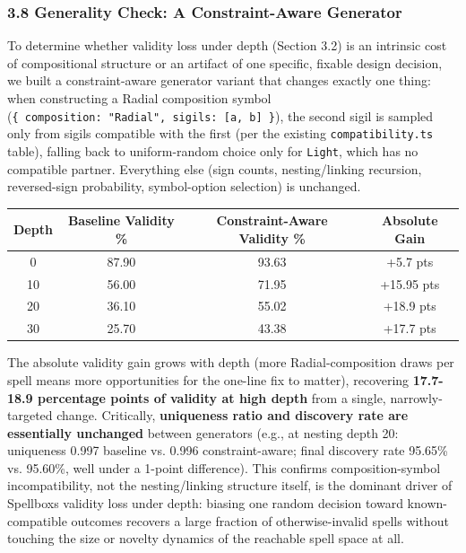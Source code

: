\documentclass[
  10pt,
  twocolumn]{article}
\begin{document}
\subsubsection{3.8 Generality Check: A Constraint-Aware
Generator}\label{38-generality-check-a-constraint-aware-generator}

To determine whether validity loss under depth (Section 3.2) is an
intrinsic cost of compositional structure or an artifact of one
specific, fixable design decision, we built a constraint-aware generator
variant that changes exactly one thing: when constructing a Radial
composition symbol
(\texttt{\{\ composition:\ "Radial",\ sigils:\ {[}a,\ b{]}\ \}}), the
second sigil is sampled only from sigils compatible with the first (per
the existing \texttt{compatibility.ts} table), falling back to
uniform-random choice only for \texttt{Light}, which has no compatible
partner. Everything else (sign counts, nesting/linking recursion,
reversed-sign probability, symbol-option selection) is unchanged.

\begin{table}[t]
\centering
\begin{tabular}{@{}cccc@{}}
\toprule
Depth & Baseline Validity \% & Constraint-Aware Validity \% & Absolute
Gain \\
\midrule
0 & 87.90 & 93.63 & +5.7 pts \\
10 & 56.00 & 71.95 & +15.95 pts \\
20 & 36.10 & 55.02 & +18.9 pts \\
30 & 25.70 & 43.38 & +17.7 pts \\
\bottomrule
\end{tabular}
\end{table}

The absolute validity gain grows with depth (more Radial-composition
draws per spell means more opportunities for the one-line fix to
matter), recovering \textbf{17.7-18.9 percentage points of validity at
high depth} from a single, narrowly-targeted change. Critically,
\textbf{uniqueness ratio and discovery rate are essentially unchanged}
between generators (e.g., at nesting depth 20: uniqueness 0.997 baseline
vs. 0.996 constraint-aware; final discovery rate 95.65\% vs. 95.60\%,
well under a 1-point difference). This confirms composition-symbol
incompatibility, not the nesting/linking structure itself, is the
dominant driver of Spellbox\textquotesingle s validity loss under depth:
biasing one random decision toward known-compatible outcomes recovers a
large fraction of otherwise-invalid spells without touching the size or
novelty dynamics of the reachable spell space at all.
\end{document}
